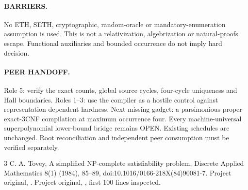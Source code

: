\documentclass[11pt]{article}
\begin{document}
\paragraph{BARRIERS.} No ETH, SETH, cryptographic, random-oracle or mandatory-enumeration assumption is used. This is not a relativization, algebrization or natural-proofs escape. Functional auxiliaries and bounded occurrence do not imply hard decision.
\paragraph{PEER HANDOFF.} Role 5: verify the exact counts, global source cycles, four-cycle uniqueness and Hall boundaries. Roles 1--3: use the compiler as a hostile control against representation-dependent hardness. Next missing gadget: a parsimonious proper-exact-3CNF compilation at maximum occurrence four. Every machine-universal superpolynomial lower-bound bridge remains OPEN. Existing schedules are unchanged. Root reconciliation and independent peer consumption must be verified separately.

\begin{thebibliography}{3}
 C. A. Tovey, A simplified NP-complete satisfiability problem, Discrete Applied Mathematics 8(1) (1984), 85--89, doi:10.1016/0166-218X(84)90081-7.
 Project original, .
 Project original, , first 100 lines inspected.
\end{thebibliography}
\end{document}
